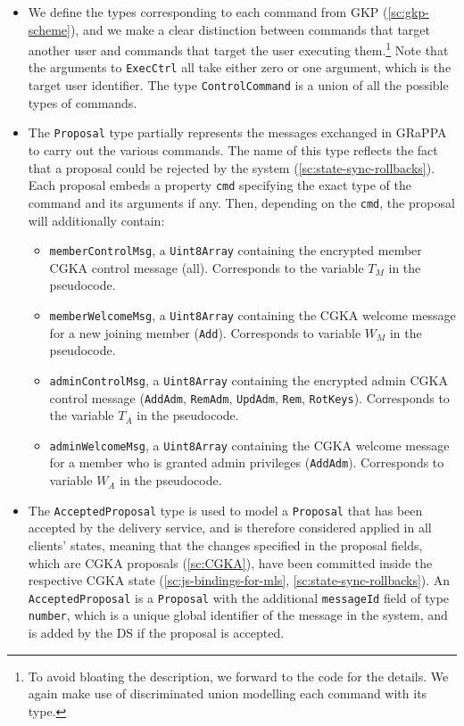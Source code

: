 \begin{itemize}
    \item We define the types corresponding to each command from GKP (\cref{sc:gkp-scheme}),
    and we make a clear distinction between commands that target another user and commands that
    target the user executing them.\footnote{To avoid bloating the description, we forward to the code for the details. We again make use of discriminated union modelling each command with its type.} 
    Note that the arguments to \texttt{ExecCtrl} all take
    either zero or one argument, which is the target user identifier.
    The type \texttt{ControlCommand} is a union of all the possible types of commands.

    \item The \texttt{Proposal} type partially represents the messages exchanged in GRaPPA 
    to carry out the various commands. The name of this type reflects the fact
    that a proposal could be rejected by the system (\cref{sc:state-sync-rollbacks}).
    Each proposal embeds a property \texttt{cmd}
    specifying the exact type of the command and its arguments if any.
    Then, depending on the \texttt{cmd}, the proposal will additionally contain:
    \begin{itemize}
        \item \texttt{memberControlMsg}, a \texttt{Uint8Array} containing the encrypted member CGKA control message (all). Corresponds to the variable $T_M$ in the pseudocode.
        \item \texttt{memberWelcomeMsg}, a \texttt{Uint8Array} containing the CGKA welcome message for a new joining member (\texttt{Add}). Corresponds to variable $W_M$ in the pseudocode.
        \item \texttt{adminControlMsg}, a \texttt{Uint8Array} containing the encrypted admin CGKA control message (\texttt{AddAdm}, \texttt{RemAdm}, \texttt{UpdAdm}, \texttt{Rem}, \texttt{RotKeys}). Corresponds to the variable $T_A$ in the pseudocode.
        \item \texttt{adminWelcomeMsg}, a \texttt{Uint8Array} containing the CGKA welcome message for a member who is granted admin privileges (\texttt{AddAdm}). Corresponds to variable $W_A$ in the pseudocode.
    \end{itemize}

    \item The \texttt{AcceptedProposal} type is used to model a \texttt{Proposal}
    that has been accepted by the delivery service,
    and is therefore considered applied in all clients' states, meaning that
    the changes specified in the proposal fields, which are CGKA proposals (\cref{sc:CGKA}),
    have been committed inside the respective CGKA state (\cref{sc:js-bindings-for-mls}, \cref{sc:state-sync-rollbacks}).
    An \texttt{AcceptedProposal} is a \texttt{Proposal} with the additional \texttt{messageId} field of type \texttt{number},
    which is a unique global identifier of the message in the system, and is added by the DS if the proposal is accepted.


\end{itemize}
